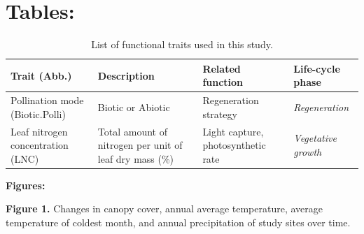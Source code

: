 \section*{Tables:}
\vspace{60pt}
\begin{table}[h]
\caption{\label{tab:functional-traits-list}List of functional traits used
in this study.}


\centering{}%
\begin{tabular}{>{\raggedright}p{}>{\raggedright}p{}>{\raggedright}p{}>{\raggedright}p{}}

\toprule
Trait (Abb.) & Description & Related function & Life-cycle phase\tabularnewline
\midrule
{\small{}Pollination mode (Biotic.Polli)} & {\small{}Biotic or Abiotic} & {\small{}Regeneration strategy} & \emph{\small{}Regeneration}\tabularnewline
{\small{}Leaf nitrogen concentration (LNC)} & {\small{}Total amount of nitrogen per unit of leaf dry mass (\%)} & {\small{}Light capture, photosynthetic rate} & \emph{\small{}Vegetative growth}\tabularnewline
\bottomrule
\end{tabular}
\end{table}

\clearpage{}
\noindent\textbf{Figures:}

\noindent \textbf{Figure 1.} Changes in canopy cover, annual average temperature, average temperature of coldest month, and annual precipitation of study sites over time.
\clearpage{}


